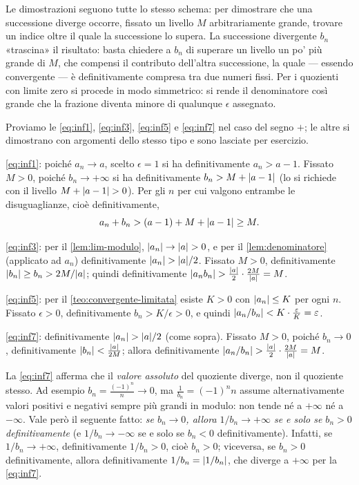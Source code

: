 \begin{strategia}
Le dimostrazioni seguono tutte lo stesso schema: per dimostrare che una successione
diverge occorre, fissato un livello $M$ arbitrariamente grande, trovare un indice oltre
il quale la successione lo supera. La successione divergente $b_{n}$ «trascina» il
risultato: basta chiedere a $b_{n}$ di superare un livello un po' più grande di $M$, che
compensi il contributo dell'altra successione, la quale --- essendo convergente --- è
definitivamente compresa tra due numeri fissi. Per i quozienti con limite zero si
procede in modo simmetrico: si rende il denominatore così grande che la frazione diventa
minore di qualunque $\epsilon$ assegnato.
\end{strategia}

\begin{dimostrazione}
Proviamo le \eqref{eq:inf1}, \eqref{eq:inf3}, \eqref{eq:inf5} e \eqref{eq:inf7} nel caso
del segno $+$; le altre si dimostrano con argomenti dello stesso tipo e sono lasciate per
esercizio.

\eqref{eq:inf1}: poiché $a_{n}\to a$, scelto $\epsilon=1$ si ha definitivamente
$a_{n}>a-1$. Fissato $M>0$, poiché $b_{n}\to+\infty$ si ha definitivamente
$b_{n}>M+\lvert a-1\rvert$ (lo si richiede con il livello $M+\lvert a-1\rvert>0$). Per gli $n$ per cui
valgono entrambe le disuguaglianze, cioè definitivamente,
\[
  a_{n}+b_{n}>(a-1)+M+\lvert a-1\rvert\ge M .
\]

\eqref{eq:inf3}: per il \cref{lem:lim-modulo}, $\lvert a_{n}\rvert\to\lvert a\rvert>0$, e per il
\cref{lem:denominatore} (applicato ad $a_{n}$) definitivamente $\lvert a_{n}\rvert>\lvert a\rvert/2$.
Fissato $M>0$, definitivamente $\lvert b_{n}\rvert\ge b_{n}>2M/\lvert a\rvert$; quindi definitivamente
$\lvert a_{n}b_{n}\rvert>\frac{\lvert a\rvert}{2}\cdot\frac{2M}{\lvert a\rvert}=M$.

\eqref{eq:inf5}: per il \cref{teo:convergente-limitata} esiste $K>0$ con $\lvert a_{n}\rvert\le K$
per ogni $n$. Fissato $\epsilon>0$, definitivamente $b_{n}>K/\epsilon>0$, e quindi
$\lvert a_{n}/b_{n}\rvert<K\cdot\frac{\varepsilon}{K}=\varepsilon$.

\eqref{eq:inf7}: definitivamente $\lvert a_{n}\rvert>\lvert a\rvert/2$ (come sopra). Fissato $M>0$, poiché
$b_{n}\to0$, definitivamente $\lvert b_{n}\rvert<\frac{\lvert a\rvert}{2M}$; allora definitivamente
$\lvert a_{n}/b_{n}\rvert>\frac{\lvert a\rvert}{2}\cdot\frac{2M}{\lvert a\rvert}=M$.
\end{dimostrazione}

\begin{attenzione}
La \eqref{eq:inf7} afferma che il \emph{valore assoluto} del quoziente diverge, non il
quoziente stesso. Ad esempio $b_{n}=\frac{(-1)^{n}}{n}\to0$, ma $\frac1{b_{n}}=(-1)^{n}n$
assume alternativamente valori positivi e negativi sempre più grandi in modulo: non
tende né a $+\infty$ né a $-\infty$. Vale però il seguente fatto: \emph{se $b_{n}\to0$, allora
$1/b_{n}\to+\infty$ se e solo se $b_{n}>0$ definitivamente} (e $1/b_{n}\to-\infty$ se e solo
se $b_{n}<0$ definitivamente). Infatti, se $1/b_{n}\to+\infty$, definitivamente
$1/b_{n}>0$, cioè $b_{n}>0$; viceversa, se $b_{n}>0$ definitivamente, allora
definitivamente $1/b_{n}=\lvert 1/b_{n}\rvert$, che diverge a $+\infty$ per la \eqref{eq:inf7}.
\end{attenzione}

